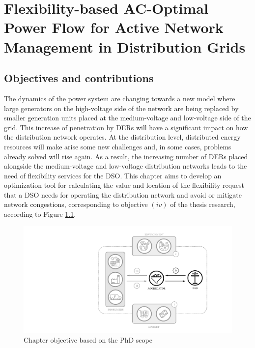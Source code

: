\chapter{Flexibility-based AC-Optimal Power Flow for Active Network Management in Distribution Grids}
\label{ChapterOPFDSO}

\section{Objectives and contributions}

The dynamics of the power system are changing towards a new model where large generators on the high-voltage side of the network are being replaced by smaller generation units placed at the medium-voltage and low-voltage side of the grid. This increase of penetration by DERs will have a significant impact on how the distribution network operates. At the distribution level, distributed energy resources will make arise some new challenges and, in some cases, problems already solved will rise again. As a result, the increasing number of DERs placed alongside the medium-voltage  and low-voltage distribution networks leads to the need of flexibility services for the DSO. 
This chapter aims to develop an optimization tool for calculating the value and location of the flexibility request that a DSO needs for operating the distribution network and avoid or mitigate network congestions, corresponding to objective $(iv)$ of the thesis research, according to Figure \ref{fig:chapter_obj_iv}. 

\begin{figure}[htbp]
	\centering
	\includegraphics[width=0.7\columnwidth ]{ChapterOPF_DSO/Figures/phd_intro_iv.pdf}
		\caption{Chapter objective based on the PhD scope}
	\label{fig:chapter_obj_iv}  
\end{figure}

